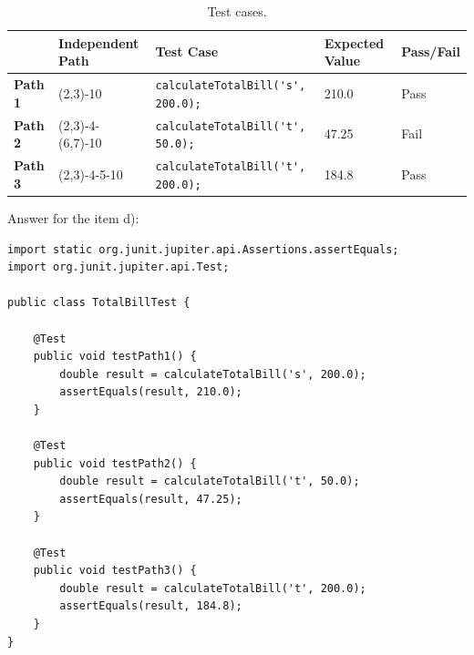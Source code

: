 \begin{solution}
    \begin{table}[H]
        \centering
        \renewcommand{\arraystretch}{1.2}
        \caption{Test cases.}
        \label{tab:ex3-test-cases}
        \begin{adjustbox}{max width=\textwidth}
            \begin{tabular}{lllll}
                \toprule
                 & Independent Path & Test Case & Expected Value & Pass/Fail\\
                \midrule
                \textbf{Path 1} & (2,3)-10 & \lstinline!calculateTotalBill('s', 200.0);! & 210.0 & Pass\\
                \textbf{Path 2} & (2,3)-4-(6,7)-10 & \lstinline!calculateTotalBill('t', 50.0);! & 47.25 & Fail\\
                \textbf{Path 3} & (2,3)-4-5-10 & \lstinline!calculateTotalBill('t', 200.0);! & 184.8 & Pass\\
                \bottomrule
            \end{tabular}
        \end{adjustbox}
    \end{table}
    
    Answer for the item d):
    \begin{lstlisting}
import static org.junit.jupiter.api.Assertions.assertEquals;
import org.junit.jupiter.api.Test;

public class TotalBillTest {

    @Test
    public void testPath1() {
        double result = calculateTotalBill('s', 200.0);
        assertEquals(result, 210.0);
    }
    
    @Test
    public void testPath2() {
        double result = calculateTotalBill('t', 50.0);
        assertEquals(result, 47.25);
    }
    
    @Test
    public void testPath3() {
        double result = calculateTotalBill('t', 200.0);
        assertEquals(result, 184.8);
    }
}
    \end{lstlisting}

\end{solution}

